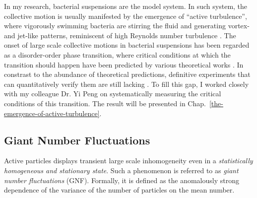 In my research, bacterial suspensions are the model system. In such system, the collective motion is usually manifested by the emergence of ``active turbulence'', where vigorously swimming bacteria are stirring the fluid and generating vortex- and jet-like patterns, reminiscent of high Reynolds number turbulence \cite{Dombrowski2004, Sokolov2007, Sokolov2009,
 Sokolov2012, Ishikawa2011, Wensink2012, Dunkel2013, Peng2020}. The onset of large scale collective motions in bacterial suspensions has been regarded as a disorder-order phase transition, where critical conditions at which the transition should happen have been predicted by various theoretical works
 \cite{Baskaran2009, Koch2011, Marchetti2013, Saintillan2015}. In constrast to the abundance of theoretical predictions, definitive experiments that can quantitatively verify them are  still lacking \cite{Koch2011, Saintillan2015}. To fill this gap, I worked closely with my colleague Dr. Yi Peng on systematically measuring the critical conditions of this transition. The result will be presented in
 Chap.~\ref{the-emergence-of-active-turbulence}.

\subsection{Giant Number Fluctuations}
Active particles displays transient large scale inhomogeneity even in a \textit{statistically homogeneous and stationary state}. Such a phenomenon is referred to as \textit{giant number fluctuations} (GNF). Formally, it is defined as the anomalously strong dependence of the variance of the number of particles on the mean number.
